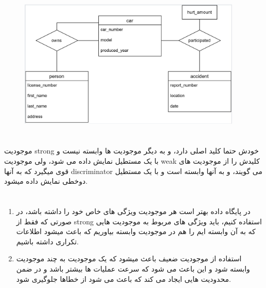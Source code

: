 \documentclass[a4paper]{article}
\makeatletter
\newcommand{\emailone}{\texttt{abbas.yazdanmehr1@gmail.com}}
\newcommand{\myinf}{
	\author{\noindent
عباس یزدان مهر
\\
99243077\\
 مهندسی کامپیوتر, دانشگاه شهید بهشتی
\\
\emailone
	}
}
\makeatother
\begin{document}
\newpage
\myinf
\section{}
\begin{figure}[H]
  \begin{small}
    \begin{center}
      \includegraphics[width=0.95\textwidth]{figures/2.jpg}
    \end{center}
  \end{small}
\end{figure}

\newpage
\myinf
\section{}
موجودیت strong  خودش حتما کلید اصلی دارد،
و به دیگر موجودیت ها وابسته نیست و با یک مستطیل
نمایش داده می شود،
ولی موجودیت weak کلیدش را از موجودیت های قوی میگیرد که به آنها discriminator می گویند، و به آنها
وابسته است 
و با یک مستطیل دوخطی نمایش داده میشود.

\section{}
\begin{enumerate}
  \item
   در پایگاه داده بهتر است هر موجودیت ویژگی های خاص
خود را داشته باشد،
در صورتی که فقط از strong استفاده کنیم، 
باید ویژگی های مربوط به موجودیت هایی که به آن وابسته ایم
را هم در موجودیت وابسته بیاوریم که باعث میشود
اطلاعات تکراری داشته باشیم.

  \item
استفاده از موجودیت ضعیف باعث میشود که یک موجودیت به
چند موجودیت وابسته شود و این باعث می شود
که سرعت عملیات ها بیشتر باشد و در ضمن 
محدودیت هایی ایجاد می کند که باعث می شود از خطاها جلوگیری
شود.
\end{enumerate}
\end{document}
